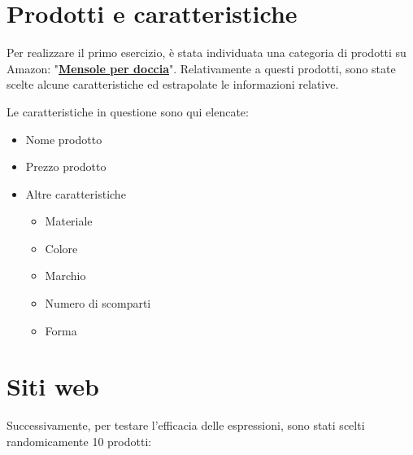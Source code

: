 \section{Prodotti e caratteristiche}
Per realizzare il primo esercizio, è stata individuata una categoria di prodotti su Amazon: "\href{https://www.amazon.it/gp/bestsellers/kitchen/731832031/ref=pd_zg_hrsr_kitchen}{\textbf{Mensole per doccia}}". Relativamente a questi prodotti, sono state scelte alcune caratteristiche ed estrapolate le informazioni relative. 

Le caratteristiche in questione sono qui elencate:

\begin{itemize}
\setlength\itemsep{0.1em}
    \item Nome prodotto
    \item Prezzo prodotto
    \item Altre caratteristiche
    \begin{itemize} \label{it:features}
        \item Materiale
        \item Colore
        \item Marchio
        \item Numero di scomparti
        \item Forma
    \end{itemize}
\end{itemize}

\section{Siti web}
Successivamente, per testare l'efficacia delle espressioni, sono stati scelti randomicamente 10 prodotti:

